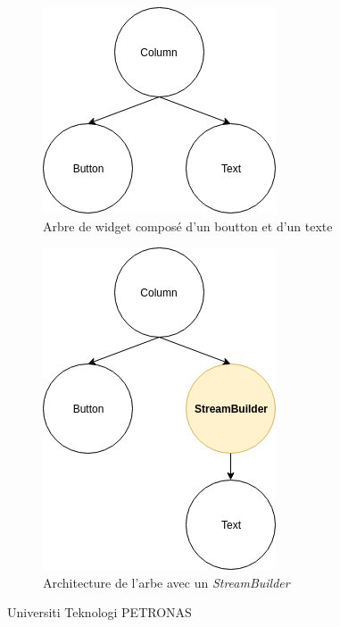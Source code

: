 \begin{figure}[H]
  \centering
  \begin{subfigure}{.5\textwidth}
    \centering
    \includegraphics[width=.8\linewidth]{content/imgs/ex1.png}
    \caption{Arbre de widget composé d'un boutton et d'un texte}
    \label{fig:stream_ex1}
  \end{subfigure}%
  \begin{subfigure}{.5\textwidth}
    \centering
    \includegraphics[width=.8\linewidth]{content/imgs/ex2.png}
    \caption{Architecture de l'arbe avec un \textit{StreamBuilder}}
  \end{subfigure}
  \caption{Universiti Teknologi PETRONAS}
\end{figure}

